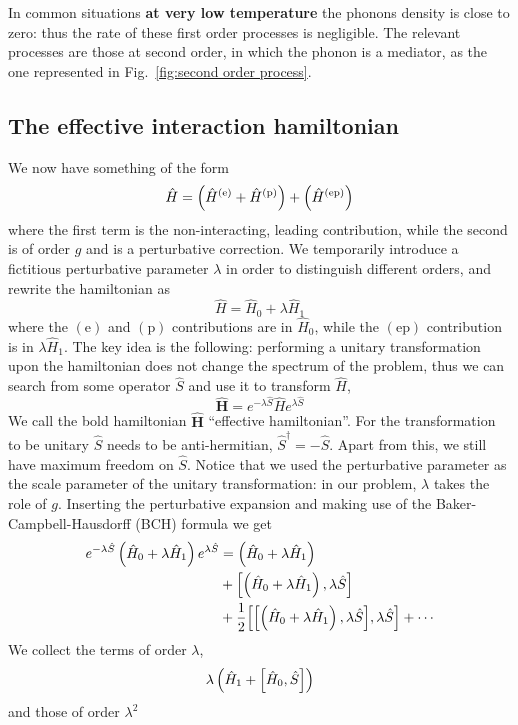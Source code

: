 In common situations \textbf{at very low temperature} the phonons density is close to zero: thus the rate of these first order processes is negligible. The relevant processes are those at second order, in which the phonon is a mediator, as the one represented in Fig.~\ref{fig:second order process}.

\subsection{The effective interaction hamiltonian}

We now have something of the form
\[
	\hat H = \left({\hat H^{(\mathrm{e})} + \hat H^{(\mathrm{p})}}\right) + \left({\hat H^{(\mathrm{ep})}}\right)
\]
where the first term is the non-interacting, leading contribution, while the second is of order $g$ and is a perturbative correction. We temporarily introduce a fictitious perturbative parameter $\lambda$ in order to distinguish different orders, and rewrite the hamiltonian as
\[
	\hat H = \hat H_0 + \lambda \hat H_1
\]
where the ${(\mathrm{e})}$ and ${(\mathrm{p})}$ contributions are in $\hat H_0$, while the ${(\mathrm{ep})}$ contribution is in $\lambda \hat H_1$.
The key idea is the following: performing a unitary transformation upon the hamiltonian does not change the spectrum of the problem, thus we can search from some operator $\hat S$ and use it to transform $\hat H$,
\[
	\hat{\bm{H}} = e^{-\lambda \hat S} \hat H e^{\lambda \hat S}
\]
We call the bold hamiltonian $\hat{\bm{H}}$ ``effective hamiltonian''. For the transformation to be unitary $\hat S$ needs to be anti-hermitian, $\hat S^\dagger = - \hat S$. Apart from this, we still have maximum freedom on $\hat S$. Notice that we used the perturbative parameter as the scale parameter of the unitary transformation: in our problem, $\lambda$ takes the role of $g$. Inserting the perturbative expansion and making use of the Baker-Campbell-Hausdorff (BCH) formula we get
\begin{align}
	e^{-\lambda \hat S} \lrR{\hat H_0 + \lambda \hat H_1} e^{\lambda \hat S} &= \lrR{\hat H_0 + \lambda \hat H_1} \label{eq:schrieffer wolf expansion} \\
	&+ \comm{\lrR{\hat H_0 + \lambda \hat H_1}}{\lambda\hat S} \nonumber \\
	&+ \half \comm{\comm{\lrR{\hat H_0 + \lambda \hat H_1}}{\lambda\hat S}}{\lambda\hat S \vphantom{A^A}} + \cdots \nonumber 
\end{align}
We collect the terms of order $\lambda$,
\[
	\lambda \lrR{\hat H_1 + \comm{\hat H_0}{\hat S}}
\]
and those of order $\lambda^2$
